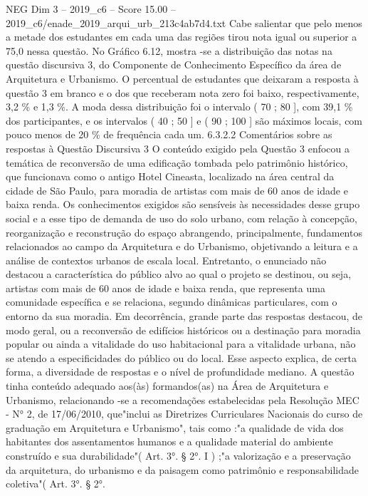 \begin{textsample}{NEG Dim 3 – 2019\_c6 – Score 15.00 – 2019\_c6/enade\_2019\_arqui\_urb\_213c4ab7d4.txt}
Cabe salientar que pelo menos a metade dos estudantes em cada uma das regiões tirou nota igual ou superior a 75,0 nessa questão.
No Gráfico 6.12, mostra -se a distribuição das notas na questão discursiva 3, do Componente de Conhecimento Específico da área de Arquitetura e Urbanismo.
O percentual de estudantes que deixaram a resposta à questão 3 em branco e o dos que receberam nota zero foi baixo, respectivamente, 3,2 \% e 1,3 \%.
A moda dessa distribuição foi o intervalo ( 70 ; 80 ], com 39,1 \% dos participantes, e os intervalos ( 40 ; 50 ] e ( 90 ; 100 ] são máximos locais, com pouco menos de 20 \% de frequência cada um. 6.3.2.2 Comentários sobre as respostas à Questão Discursiva 3 O conteúdo exigido pela Questão 3 enfocou a temática de reconversão de uma edificação tombada pelo patrimônio histórico, que funcionava como o antigo Hotel Cineasta, localizado na área central da cidade de São Paulo, para moradia de artistas com mais de 60 anos de idade e baixa renda.
Os conhecimentos exigidos são sensíveis às necessidades desse grupo social e a esse tipo de demanda de uso do solo urbano, com relação à concepção, reorganização e reconstrução do espaço abrangendo, principalmente, fundamentos relacionados ao campo da Arquitetura e do Urbanismo, objetivando a leitura e a análise de contextos urbanos de escala local.
Entretanto, o enunciado não destacou a característica do público alvo ao qual o projeto se destinou, ou seja, artistas com mais de 60 anos de idade e baixa renda, que representa uma comunidade específica e se relaciona, segundo dinâmicas particulares, com o entorno da sua moradia.
Em decorrência, grande parte das respostas destacou, de modo geral, ou a reconversão de edifícios históricos ou a destinação para moradia popular ou ainda a vitalidade do uso habitacional para a vitalidade urbana, não se atendo a especificidades do público ou do local.
Esse aspecto explica, de certa forma, a diversidade de respostas e o nível de profundidade mediano.
A questão tinha conteúdo adequado aos(às) formandos(as) na Área de Arquitetura e Urbanismo, relacionando -se a recomendações estabelecidas pela Resolução MEC - N{\EmojiFont °} 2, de 17/06/2010, que"inclui as Diretrizes Curriculares Nacionais do curso de graduação em Arquitetura e Urbanismo", tais como :"a qualidade de vida dos habitantes dos assentamentos humanos e a qualidade material do ambiente construído e sua durabilidade"( Art. 3{\EmojiFont °}. § 2{\EmojiFont °}.
I ) ;"a valorização e a preservação da arquitetura, do urbanismo e da paisagem como patrimônio e responsabilidade coletiva"( Art. 3{\EmojiFont °}. § 2{\EmojiFont °}.

\end{textsample}
